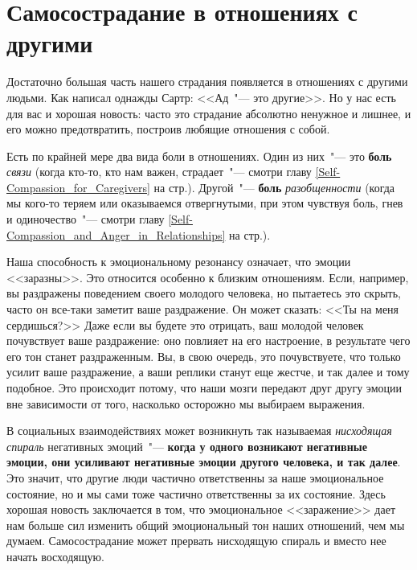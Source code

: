 
\chapter{Самосострадание в отношениях с другими} \label{Self-Compassion_in_Relationships}

Достаточно большая часть нашего страдания появляется в отношениях с другими людьми. Как написал однажды Сартр: <<Ад~"--- это другие>>\cite{93}. Но у нас есть для вас и хорошая новость: часто это страдание абсолютно ненужное и лишнее, и его можно предотвратить, построив любящие отношения с собой. 

Есть по крайней мере два вида боли в отношениях. Один из них~"--- это \textbf{боль} \emph{связи} (когда кто-то, кто нам важен, страдает~"--- смотри главу \ref{Self-Compassion_for_Caregivers} на стр.\:\pageref{Self-Compassion_for_Caregivers}). Другой~"--- \textbf{боль} \emph{разобщенности} (когда мы кого-то теряем или оказываемся отвергнутыми, при этом чувствуя боль, гнев и одиночество~"--- смотри главу \ref{Self-Compassion_and_Anger_in_Relationships} на стр.\:\pageref{Self-Compassion_and_Anger_in_Relationships}).

Наша способность к эмоциональному резонансу означает, что эмоции <<заразны>>\cite{94}. Это относится особенно к близким отношениям. Если, например, вы раздражены поведением своего молодого человека, но пытаетесь это скрыть, часто он все-таки заметит ваше раздражение. Он может сказать: <<Ты на меня сердишься?>> Даже если вы будете это отрицать, ваш молодой человек почувствует ваше раздражение: оно повлияет на его настроение, в результате чего его тон станет раздраженным. Вы, в свою очередь, это почувствуете, что только усилит ваше раздражение, а ваши реплики станут еще жестче, и так далее и тому подобное. Это происходит потому, что наши мозги передают друг другу эмоции вне зависимости от того, насколько осторожно мы выбираем выражения. 

В социальных взаимодействиях может возникнуть так называемая \emph{нисходящая спираль} негативных эмоций~"--- \textbf{когда у одного возникают негативные эмоции, они усиливают негативные эмоции другого человека, и так далее}\cite{95}. Это значит, что другие люди частично ответственны за наше эмоциональное состояние, но и мы сами тоже частично ответственны за их состояние. Здесь хорошая новость заключается в том, что эмоциональное <<заражение>> дает нам больше сил изменить общий эмоциональный тон наших отношений, чем мы думаем. Самосострадание может прервать нисходящую спираль и вместо нее начать восходящую. 

